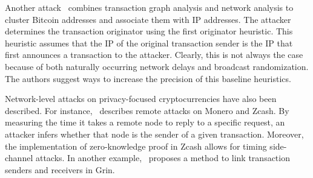 Another attack~\cite{Neudecker2017} combines transaction graph analysis and network analysis to cluster Bitcoin addresses and associate them with IP addresses.
The attacker determines the transaction originator using the first originator heuristic.
This heuristic assumes that the IP of the original transaction sender is the IP that first announces a transaction to the attacker.
Clearly, this is not always the case because of both naturally occurring network delays and broadcast randomization.
The authors suggest ways to increase the precision of this baseline heuristics.

Network-level attacks on privacy-focused cryptocurrencies have also been described.
For instance,~\cite{Tramer2020} describes remote attacks on Monero and Zcash.
By measuring the time it takes a remote node to reply to a specific request, an attacker infers whether that node is the sender of a given transaction.
Moreover, the implementation of zero-knowledge proof in Zcash allows for timing side-channel attacks.
In another example,~\cite{Bogatyy2019} proposes a method to link transaction senders and receivers in Grin.

